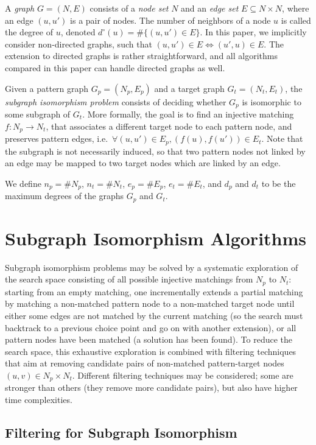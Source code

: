 \documentclass{llncs}
\begin{document}
A \emph{graph} $G=(N,E)$ consists of a \emph{node set} $N$ and an \emph{edge set} $E \subseteq N
\times N$, where an edge $(u,u')$ is a pair of nodes. The number of neighbors of a node $u$ is
called the degree of $u$, denoted $d^\circ(u)=\#\{ (u,u')\in E\}$. In this paper, we implicitly consider
non-directed graphs, such that $(u,u')\in E\Leftrightarrow (u',u)\in E$. The extension to directed
graphs is rather straightforward, and all algorithms compared in this paper can handle directed
graphs as well.

Given a pattern graph $G_p=(N_p,E_p)$ and a target graph $G_t=(N_t,E_t)$, the \emph{subgraph
isomorphism problem} consists of deciding whether $G_p$ is isomorphic to some subgraph of $G_t$.
More formally, the goal is to find an injective matching $f: N_p\rightarrow N_t$, that associates a
different target node to each pattern node, and preserves pattern edges, i.e.\ $\forall (u,u')
\in E_p, (f(u),f(u')) \in E_t$.
Note that the subgraph is not necessarily induced, so that two pattern nodes not linked by
an edge may be mapped to two target nodes which are linked by an edge.

We define $n_p = \# N_p$, $n_t = \# N_t$,  $e_p=\# E_p$, $e_t=\# E_t$, and $d_p$
and $d_t$ to be the maximum degrees of the graphs $G_p$ and $G_t$.

\section{Subgraph Isomorphism Algorithms}\label{sec:algs}

Subgraph isomorphism problems may be solved by a systematic exploration of the search space consisting
of all possible injective matchings from $N_p$ to $N_t$: starting from an empty matching, one
incrementally extends a partial matching by matching a non-matched pattern node to a non-matched
target node until either some edges are not matched by the current matching (so the search must
backtrack to a previous choice point and go on with another extension), or all pattern nodes have
been matched (a solution has been found). To reduce the search space, this exhaustive exploration is
combined with filtering techniques that aim at removing candidate pairs of non-matched
pattern-target nodes $(u,v)\in N_p\times N_t$. Different filtering techniques may be considered;
some are stronger than others (they remove more candidate pairs), but also have higher time
complexities.

\subsection{Filtering for Subgraph Isomorphism}
\end{document}
